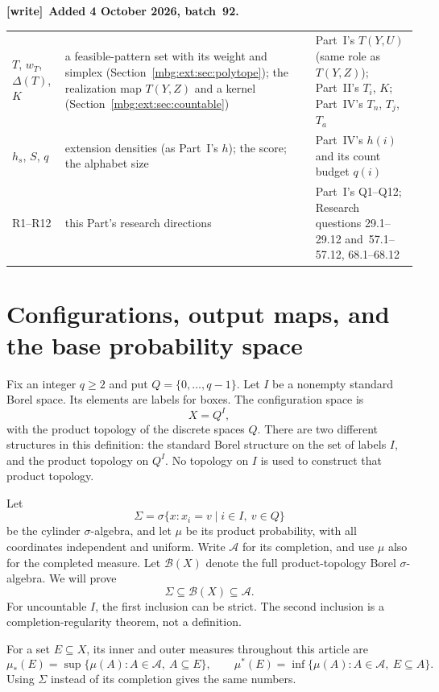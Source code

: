 \documentclass[11pt,letterpaper]{article}
\theoremstyle{definition}
\newcommand{\A}{\mathcal A}
\newcommand{\B}{\mathcal B}
\newcommand{\cyl}{\Sigma}
\newenvironment{writenote}[1][]{\par\smallskip\begingroup\small
 \noindent\textbf{[write]}\if\relax\detokenize{#1}\relax\else~\textbf{#1.}\fi\ }%
 {\par\endgroup\smallskip}
\begin{document}
\begin{writenote}[Added 4 October 2026, batch~92]
\begin{longtable}{>{\raggedright\arraybackslash}p{}>{\raggedright\arraybackslash}p{}>{\raggedright\arraybackslash}p{}}
$T$, $w_T$, $\Delta(T)$, $K$ & a feasible-pattern set with its weight and simplex (Section~\ref{mbg:ext:sec:polytope}); the realization map $T(Y,Z)$ and a kernel (Section~\ref{mbg:ext:sec:countable}) & Part~I's $T(Y,U)$ (same role as $T(Y,Z)$); Part~II's $T_i$, $K$; Part~IV's $T_n$, $T_j$, $T_a$\\
$h_s$, $S$, $q$ & extension densities (as Part~I's $h$); the score; the alphabet size & Part~IV's $h(i)$ and its count budget $q(i)$\\
R1--R12 & this Part's research directions & Part~I's Q1--Q12; Research questions 29.1--29.12 and~57.1--57.12, 68.1--68.12\\
\bottomrule
\end{longtable}
\end{writenote}

\section{Configurations, output maps, and the base probability space}
\label{mbg:ext:sec:model}

Fix an integer $q\ge2$ and put $Q=\{0,\ldots,q-1\}$. Let $I$ be a nonempty standard Borel space. Its elements are labels for boxes. The configuration space is
\[
X=Q^I,
\]
with the product topology of the discrete spaces $Q$. There are two different structures in this definition: the standard Borel structure on the set of labels $I$, and the product topology on $Q^I$. No topology on $I$ is used to construct that product topology.

Let
\[
\cyl=\sigma\{x:x_i=v\mid i\in I,\ v\in Q\}
\]
be the cylinder $\sigma$-algebra, and let $\mu$ be its product probability, with all coordinates independent and uniform. Write $\A$ for its completion, and use $\mu$ also for the completed measure. Let $\B(X)$ denote the full product-topology Borel $\sigma$-algebra. We will prove
\begin{equation}
\cyl\subseteq\B(X)\subseteq\A.
\label{mbg:ext:eq:inclusions}
\end{equation}
For uncountable $I$, the first inclusion can be strict. The second inclusion is a completion-regularity theorem, not a definition.

For a set $E\subseteq X$, its inner and outer measures throughout this article are
\[
\mu_*(E)=\sup\{\mu(A):A\in\A,\ A\subseteq E\},\qquad
\mu^*(E)=\inf\{\mu(A):A\in\A,\ E\subseteq A\}.
\]
Using $\cyl$ instead of its completion gives the same numbers.
\end{document}
